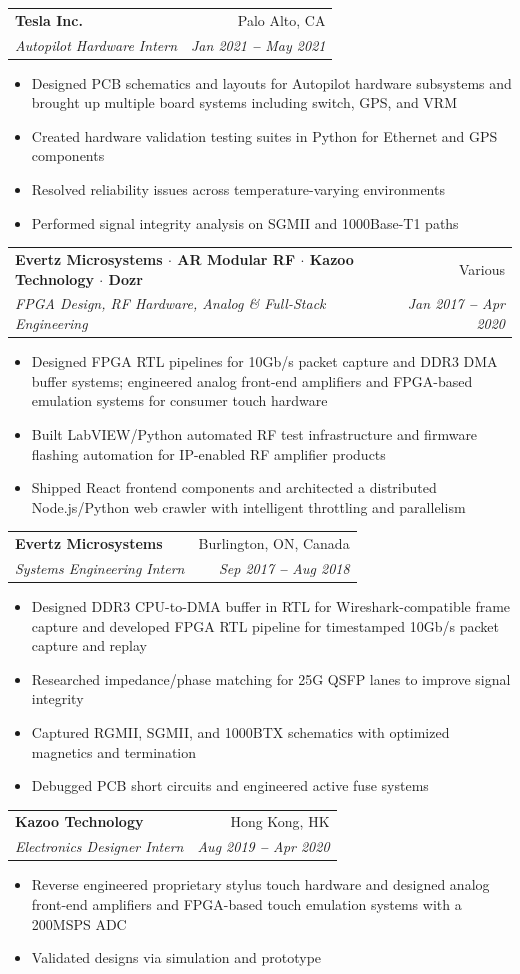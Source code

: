 \documentclass[letterpaper,11pt]{article}
\makeatletter
\newcommand{\resumeItem}[1]{
  \item\small{
    {#1 \vspace{-2pt}}
  }
}
\newcommand{\resumeSubheading}[4]{
  \vspace{-2pt}\item
    \begin{tabular*}{0.97\textwidth}[t]{l@{\extracolsep{\fill}}r}
      \textbf{#1} & #2 \\
      \textit{\small#3} & \textit{\small #4} \\
    \end{tabular*}\vspace{-7pt}
}
\newcommand{\resumeItemListStart}{\begin{itemize}}
\newcommand{\resumeItemListEnd}{\end{itemize}\vspace{-5pt}}
\makeatother
\begin{document}
  \resumeSubheading
    {Tesla Inc.}{Palo Alto, CA}
    {Autopilot Hardware Intern}{Jan 2021 \textbf{--} May 2021}
    \resumeItemListStart
      \resumeItem{Designed PCB schematics and layouts for Autopilot hardware subsystems and brought up multiple board systems including switch, GPS, and VRM}
      \resumeItem{Created hardware validation testing suites in Python for Ethernet and GPS components}
      \resumeItem{Resolved reliability issues across temperature-varying environments}
      \resumeItem{Performed signal integrity analysis on SGMII and 1000Base-T1 paths}
    \resumeItemListEnd

  \fi

  \ifdefined\compactmode
  \resumeSubheading
    {Evertz Microsystems $\cdot$ AR Modular RF $\cdot$ Kazoo Technology $\cdot$ Dozr}{Various}
    {FPGA Design, RF Hardware, Analog \& Full-Stack Engineering}{Jan 2017 \textbf{--} Apr 2020}
    \resumeItemListStart
      \resumeItem{Designed FPGA RTL pipelines for 10Gb/s packet capture and DDR3 DMA buffer systems; engineered analog front-end amplifiers and FPGA-based emulation systems for consumer touch hardware}
      \resumeItem{Built LabVIEW/Python automated RF test infrastructure and firmware flashing automation for IP-enabled RF amplifier products}
      \resumeItem{Shipped React frontend components and architected a distributed Node.js/Python web crawler with intelligent throttling and parallelism}
    \resumeItemListEnd
  \else

  \resumeSubheading
    {Evertz Microsystems}{Burlington, ON, Canada}
    {Systems Engineering Intern}{Sep 2017 \textbf{--} Aug 2018}
    \resumeItemListStart
      \resumeItem{Designed DDR3 CPU-to-DMA buffer in RTL for Wireshark-compatible frame capture and developed FPGA RTL pipeline for timestamped 10Gb/s packet capture and replay}
      \resumeItem{Researched impedance/phase matching for 25G QSFP lanes to improve signal integrity}
      \resumeItem{Captured RGMII, SGMII, and 1000BTX schematics with optimized magnetics and termination}
      \resumeItem{Debugged PCB short circuits and engineered active fuse systems}
    \resumeItemListEnd

  \resumeSubheading
    {Kazoo Technology}{Hong Kong, HK}
    {Electronics Designer Intern}{Aug 2019 \textbf{--} Apr 2020}
    \resumeItemListStart
      \resumeItem{Reverse engineered proprietary stylus touch hardware and designed analog front-end amplifiers and FPGA-based touch emulation systems with a 200MSPS ADC}
      \resumeItem{Validated designs via simulation and prototype}
    \resumeItemListEnd
\end{document}
